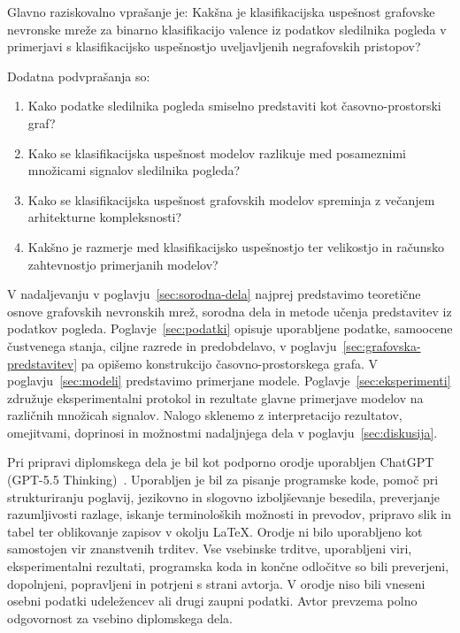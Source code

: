 \newcommand{\rvGlavnoBesedilo}{Kakšna je klasifikacijska uspešnost grafovske nevronske mreže za binarno klasifikacijo valence iz podatkov sledilnika pogleda v primerjavi s klasifikacijsko uspešnostjo uveljavljenih negrafovskih pristopov?}

Glavno raziskovalno vprašanje je: \rvGlavnoBesedilo

Dodatna podvprašanja so:

\begin{enumerate}
    \item \label{pv:grafovska-predstavitev} Kako podatke sledilnika pogleda smiselno predstaviti kot časovno-prostorski graf?
    \item \label{pv:mnozice-signalov} Kako se klasifikacijska uspešnost modelov razlikuje med posameznimi množicami signalov sledilnika pogleda?
    \item \label{pv:kompleksnost-gnn} Kako se klasifikacijska uspešnost grafovskih modelov spreminja z večanjem arhitekturne kompleksnosti?
    \item \label{pv:racunska-zahtevnost} Kakšno je razmerje med klasifikacijsko uspešnostjo ter velikostjo in računsko zahtevnostjo primerjanih modelov?
\end{enumerate}

V nadaljevanju v poglavju~\ref{sec:sorodna-dela} najprej predstavimo teoretične osnove grafovskih nevronskih mrež, sorodna dela in metode učenja predstavitev iz podatkov pogleda.
Poglavje~\ref{sec:podatki} opisuje uporabljene podatke, samoocene čustvenega stanja, ciljne razrede in predobdelavo, v poglavju~\ref{sec:grafovska-predstavitev} pa opišemo konstrukcijo časovno-prostorskega grafa.
V poglavju~\ref{sec:modeli} predstavimo primerjane modele.
Poglavje~\ref{sec:eksperimenti} združuje eksperimentalni protokol in rezultate glavne primerjave modelov na različnih množicah signalov.
Nalogo sklenemo z interpretacijo rezultatov, omejitvami, doprinosi in možnostmi nadaljnjega dela v poglavju~\ref{sec:diskusija}.

Pri pripravi diplomskega dela je bil kot podporno orodje uporabljen \mbox{ChatGPT} (GPT-5.5 Thinking)~\cite{openai_chatgpt_2026}. Uporabljen je bil za
pisanje programske kode, pomoč pri strukturiranju poglavij,
jezikovno in slogovno izboljševanje besedila, preverjanje
razumljivosti razlage, iskanje terminoloških možnosti in prevodov, pripravo
slik in tabel ter oblikovanje zapisov v okolju \LaTeX.
Orodje ni bilo uporabljeno kot samostojen vir znanstvenih trditev. Vse
vsebinske trditve, uporabljeni viri, eksperimentalni rezultati, programska
koda in končne odločitve so bili preverjeni, dopolnjeni, popravljeni in
potrjeni s strani avtorja. V orodje niso bili vneseni osebni podatki
udeležencev ali drugi zaupni podatki. Avtor prevzema polno odgovornost za
vsebino diplomskega dela.
